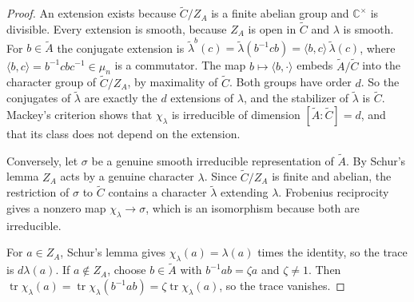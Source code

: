 \documentclass[12pt,letterpaper]{article}
\numberwithin{equation}{section}
\theoremstyle{plain}
\theoremstyle{definition}
\theoremstyle{remark}
\newcommand{\At}{\widetilde A}
\newcommand{\Ct}{\widetilde C}
\newcommand{\Cc}{\mathbb C}
\newcommand{\ZA}{Z_A}
\DeclareMathOperator{\tr}{tr}
\begin{document}
\begin{proof}
An extension exists because $\Ct/\ZA$ is a finite abelian group and
$\Cc^\times$ is divisible. Every extension is smooth, because $\ZA$ is
open in $\Ct$ and $\lambda$ is smooth. For $b\in\At$ the conjugate extension is
$\tilde\lambda^b(c)=\tilde\lambda(b^{-1}cb)=\langle b,c\rangle\,
\tilde\lambda(c)$, where $\langle b,c\rangle=b^{-1}cbc^{-1}\in\mu_n$
is a commutator. The map $b\mapsto\langle b,\cdot\rangle$ embeds
$\At/\Ct$ into the character group of $\Ct/\ZA$, by maximality of
$\Ct$. Both groups have order $d$. So the conjugates of
$\tilde\lambda$ are exactly the $d$ extensions of $\lambda$, and the
stabilizer of $\tilde\lambda$ is $\Ct$. Mackey's criterion shows that
$\chi_\lambda$ is irreducible of dimension $[\At:\Ct]=d$, and that its
class does not depend on the extension.

Conversely, let $\sigma$ be a genuine smooth irreducible
representation of $\At$. By Schur's lemma $\ZA$ acts by a genuine
character $\lambda$. Since $\Ct/\ZA$ is finite and abelian, the
restriction of $\sigma$ to $\Ct$ contains a character $\tilde\lambda$
extending $\lambda$. Frobenius reciprocity gives a nonzero map
$\chi_\lambda\to\sigma$, which is an isomorphism because both are
irreducible.

For $a\in\ZA$, Schur's lemma gives $\chi_\lambda(a)=\lambda(a)$ times
the identity, so the trace is $d\lambda(a)$. If $a\notin\ZA$, choose
$b\in\At$ with $b^{-1}ab=\zeta a$ and $\zeta\ne1$. Then
$\tr\chi_\lambda(a)=\tr\chi_\lambda(b^{-1}ab)=\zeta\tr\chi_\lambda(a)$,
so the trace vanishes.
\end{proof}
\end{document}
